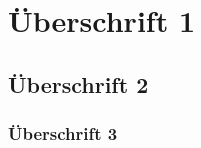 %
%

\newcommand{\SUBJECT}{Modultitel Abk}
\newcommand{\TITLE}{Dokumenttitel}
\newcommand{\SEMESTER}{2. Semester (FS 2013)}
\newcommand{\AUTHOR}{Emanuel Duss}
\newcommand{\EMAIL}{emanuel.duss@gmail.com}
\newcommand{\KEYWORDS}{Zusammenfassung, Informatik, HSR}



\section{Überschrift 1}
\subsection{Überschrift 2}
\subsubsection{Überschrift 3}



